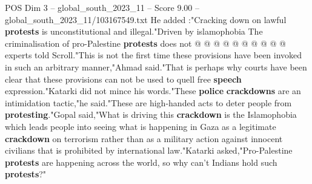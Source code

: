 \begin{textsample}{POS Dim 3 – global\_south\_2023\_11 – Score 9.00 – global\_south\_2023\_11/103167549.txt}
He added :"Cracking down on lawful \textbf{protests} is unconstitutional and illegal."Driven by islamophobia The criminalisation of pro-Palestine \textbf{protests} does not @ @ @ @ @ @ @ @ @ @ experts told Scroll."This is not the first time these provisions have been invoked in such an arbitrary manner,"Ahmad said."That is perhaps why courts have been clear that these provisions can not be used to quell free \textbf{speech} expression."Katarki did not mince his words."These \textbf{police} \textbf{crackdowns} are an intimidation tactic,"he said."These are high-handed acts to deter people from \textbf{protesting}."Gopal said,"What is driving this \textbf{crackdown} is the Islamophobia which leads people into seeing what is happening in Gaza as a legitimate \textbf{crackdown} on terrorism rather than as a military action against innocent civilians that is prohibited by international law."Katarki asked,"Pro-Palestine \textbf{protests} are happening across the world, so why can't Indians hold such \textbf{protests}?"

\end{textsample}
